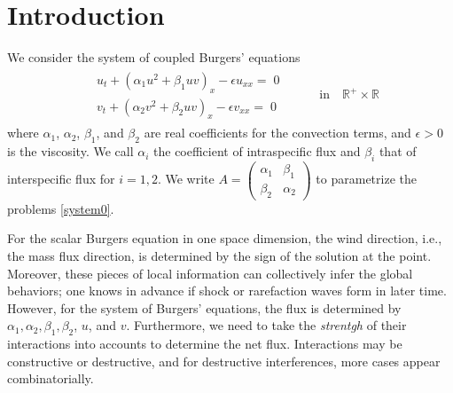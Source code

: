 \documentclass{amsart}
\theoremstyle{definition}
\numberwithin{equation}{section}
\begin{document}
\section{Introduction} \label{sec:intro}
We consider the system of coupled Burgers' equations
\begin{align}\label{system0} %
\begin{aligned}
&u_{t} + ( \alpha_{1}u^{2} + \beta_{1}uv )_{x} -\epsilon u_{xx} = \; 0 \\
&v_{t} + ( \alpha_{2}v^{2} + \beta_{2}uv )_{x} -\epsilon v_{xx} = \; 0 
\end{aligned} \quad \quad &\text{in} \quad \mathbb{R}^+\times \mathbb{R}
\end{align}
where $\alpha_1$, $\alpha_2$, $\beta_1$, and $\beta_2 $ are real coefficients for the convection terms, and $\epsilon >0$ is the viscosity. We call $\alpha_i$ the coefficient of intraspecific flux and $\beta_i$ that of interspecific flux for $i=1,2$. We write $A = \begin{pmatrix}                                                 \alpha_1 & \beta_1\\  \beta_2 & \alpha_2  \end{pmatrix}$ to parametrize the problems \eqref{system0}. 

For the scalar Burgers equation in one space dimension, the wind direction, i.e., the mass flux direction, is determined by the sign of the solution at the point. Moreover, these pieces of local information can collectively infer the global behaviors; one knows in advance if shock or rarefaction waves form in later time. However, for the system of Burgers' equations, the flux is determined by $\alpha_1, \alpha_2, \beta_1, \beta_2$, $u$, and $v$. Furthermore, we need to take the {\it strentgh} of their interactions into accounts to determine the net flux. Interactions may be constructive or destructive, and for destructive interferences, more cases appear combinatorially.%
\end{document}
